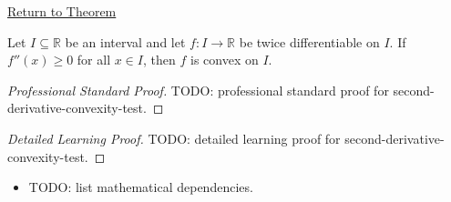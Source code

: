 \newpage
{}
\label{prf:second-derivative-convexity-test}

\begin{remark*}[Return]
\hyperref[thm:second-derivative-convexity-test]{Return to Theorem}
\end{remark*}

\begin{theorem*}
Let $I\subseteq\mathbb{R}$ be an interval and let $f:I\to\mathbb{R}$ be twice differentiable on $I$. If $f''(x)\geq 0$ for all $x\in I$, then $f$ is convex on $I$.
\end{theorem*}

\begin{proof}[Professional Standard Proof]
\LRAProofBodyStart
TODO: professional standard proof for second-derivative-convexity-test.
\end{proof}

\begin{proof}[Detailed Learning Proof]
\LRAProofBodyStart
TODO: detailed learning proof for second-derivative-convexity-test.
\end{proof}

\begin{remark*}
\end{remark*}

\begin{dependencies}
\begin{itemize}
  \item TODO: list mathematical dependencies.
\end{itemize}
\end{dependencies}

\clearpage

